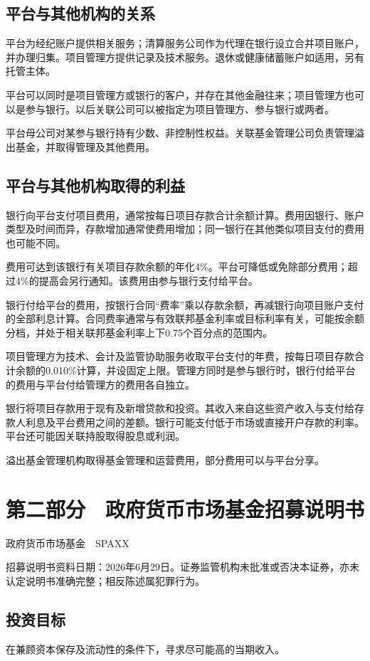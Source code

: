 \documentclass[UTF8,fontset=none,11pt,a4paper]{ctexart}
\begin{document}
\subsection*{平台与其他机构的关系}
平台为经纪账户提供相关服务；清算服务公司作为代理在银行设立合并项目账户，并办理归集。项目管理方提供记录及技术服务。退休或健康储蓄账户如适用，另有托管主体。


平台可以同时是项目管理方或银行的客户，并存在其他金融往来；项目管理方也可以是参与银行。以后关联公司可以被指定为项目管理方、参与银行或两者。


平台母公司对某参与银行持有少数、非控制性权益。关联基金管理公司负责管理溢出基金，并取得管理及其他费用。


\subsection*{平台与其他机构取得的利益}
银行向平台支付项目费用，通常按每日项目存款合计余额计算。费用因银行、账户类型及时间而异，存款增加通常使费用增加；同一银行在其他类似项目支付的费用也可能不同。


费用可达到该银行有关项目存款余额的年化4\%。平台可降低或免除部分费用；超过4\%的提高会另行通知。该费用由参与银行支付给平台。


银行付给平台的费用，按银行合同“费率”乘以存款余额，再减银行向项目账户支付的全部利息计算。合同费率通常与有效联邦基金利率或目标利率有关，可能按余额分档，并处于相关联邦基金利率上下0.75个百分点的范围内。


项目管理方为技术、会计及监管协助服务收取平台支付的年费，按每日项目存款合计余额的0.010\%计算，并设固定上限。管理方同时是参与银行时，银行付给平台的费用与平台付给管理方的费用各自独立。


银行将项目存款用于现有及新增贷款和投资。其收入来自这些资产收入与支付给存款人利息及平台费用之间的差额。银行可能支付低于市场或直接开户存款的利率。平台还可能因关联持股取得股息或利润。


溢出基金管理机构取得基金管理和运营费用，部分费用可以与平台分享。


\section*{第二部分　政府货币市场基金招募说明书}
政府货币市场基金　SPAXX


招募说明书资料日期：2026年6月29日。证券监管机构未批准或否决本证券，亦未认定说明书准确完整；相反陈述属犯罪行为。


\subsection*{投资目标}
在兼顾资本保存及流动性的条件下，寻求尽可能高的当期收入。
\end{document}
